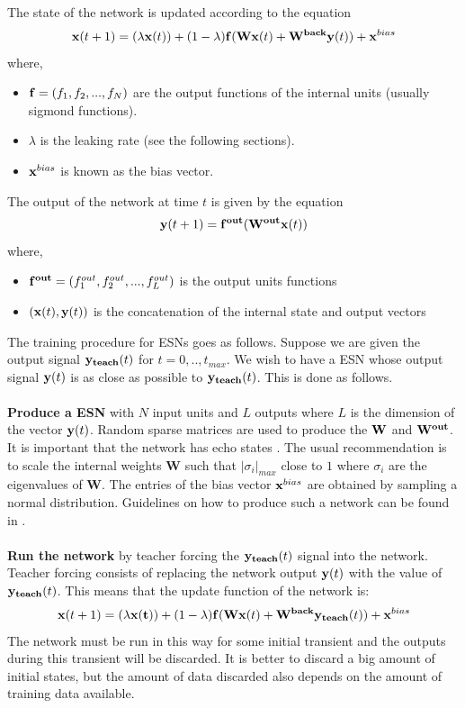 \documentclass[letterpaper,9pt]{article}
\begin{document}
The state of the network is updated according to the equation
\[
{\bf x}(t+1)= (\lambda {\bf x}(t)) + (1-\lambda){\bf f}({\bf Wx}(t) + {\bf W^{back}y}(t)) + {\bf x}^{bias}
\]
where,
\begin{itemize}
  \item ${\bf f}=(f_1,f_2,...,f_N)$ are the output functions of the internal units (usually sigmond functions).
  \item $\lambda$ is the leaking rate (see the following sections).
  \item ${\bf x}^{bias}$ is known as the bias vector.
\end{itemize}
The output of the network at time $t$ is given by the equation
\[
{\bf y}(t+1)={\bf f^{out}}({\bf W^{out}}{\bf x}(t))
\]
where,
\begin{itemize}
  \item ${\bf f^{out}}=(f_1^{out},f_2^{out},...,f_L^{out})$ is the output units functions
  \item $({\bf x}(t),{\bf y}(t))$ is the concatenation of the internal state and output vectors
\end{itemize}
The training procedure for ESNs goes as follows. Suppose we are given the output signal ${\bf y_{teach}}(t)$ for $t=0,..,t_{max}$. We wish to have a ESN whose output signal ${\bf y}(t)$ is as close as possible to ${\bf y_{teach}}(t)$. This is done as follows.\\\\
{\bf Produce a ESN} with $N$ input units and $L$ outputs where $L$ is the dimension of the vector ${\bf y}(t)$. Random sparse matrices are used to produce the ${\bf W}$ and ${\bf W^{out}}$. It is important that the network has echo states \cite{JaegerESNTutorial}. The usual recommendation is to scale the internal weights {\bf W} such that $|\sigma_i |_{max}$ close to $1$ where $\sigma_i$ are the eigenvalues of {\bf W}. The entries of the bias vector ${\bf x}^{bias}$ are obtained by sampling a normal distribution. Guidelines on how to produce such a network can be found in \cite{JaegerESNTutorial}.\\\\
{\bf Run the network} by teacher forcing the ${\bf y_{teach}}(t)$ signal into the network. Teacher forcing consists of replacing the network output ${\bf y}(t)$ with the value of ${\bf y_{teach}}(t)$. This means that the update function of the network is:
\[
{\bf x}(t+1)= (\lambda {\bf x(t)}) + (1-\lambda){\bf f}({\bf Wx}(t) + {\bf W^{back}y_{teach}}(t)) + {\bf x}^{bias}
\]
The network must be run in this way for some initial transient and the outputs during this transient will be discarded. It is better to discard a big amount of initial states, but the amount of data discarded also depends on the amount of training data available.\pagebreak
\end{document}

